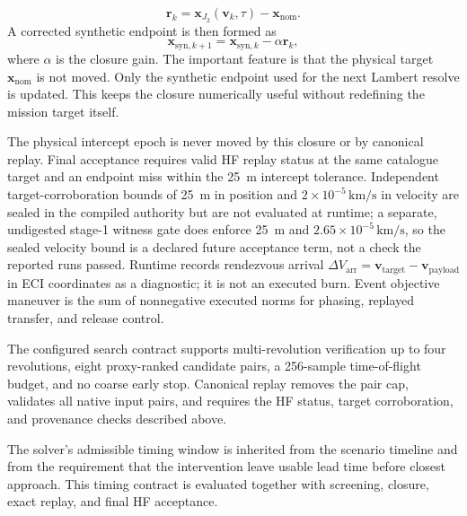     \begin{equation}
        \mathbf{r}_k = \mathbf{x}_{J_2}(\mathbf{v}_k,\tau) - \mathbf{x}_{\mathrm{nom}}.
    \end{equation}
    A corrected synthetic endpoint is then formed as
    \begin{equation}
        \mathbf{x}_{\mathrm{syn},k+1} = \mathbf{x}_{\mathrm{syn},k} - \alpha \mathbf{r}_k,
    \end{equation}
    where \(\alpha\) is the closure gain. The important feature is that the physical target \(\mathbf{x}_{\mathrm{nom}}\) is not moved. Only the synthetic endpoint used for the next Lambert resolve is updated. This keeps the closure numerically useful without redefining the mission target itself.

    The physical intercept epoch is never moved by this closure or by canonical replay. Final acceptance requires valid HF replay status at the same catalogue target and an endpoint miss within the \SI{25}{\metre} intercept tolerance. Independent target-corroboration bounds of \SI{25}{\metre} in position and \(2\times10^{-5}\,\si{\kilo\metre\per\second}\) in velocity are sealed in the compiled authority but are not evaluated at runtime; a separate, undigested stage-1 witness gate does enforce \SI{25}{\metre} and \(2.65\times10^{-5}\,\si{\kilo\metre\per\second}\), so the sealed velocity bound is a declared future acceptance term, not a check the reported runs passed. Runtime records rendezvous arrival \(\Delta V_{\mathrm{arr}}=\mathbf{v}_{\mathrm{target}}-\mathbf{v}_{\mathrm{payload}}\) in ECI coordinates as a diagnostic; it is not an executed burn. Event objective maneuver is the sum of nonnegative executed norms for phasing, replayed transfer, and release control.

    The configured search contract supports multi-revolution verification up to four revolutions, eight proxy-ranked candidate pairs, a \num{256}-sample time-of-flight budget, and no coarse early stop. Canonical replay removes the pair cap, validates all native input pairs, and requires the HF status, target corroboration, and provenance checks described above.

    The solver's admissible timing window is inherited from the scenario timeline and from the requirement that the intervention leave usable lead time before closest approach. This timing contract is evaluated together with screening, closure, exact replay, and final HF acceptance.

